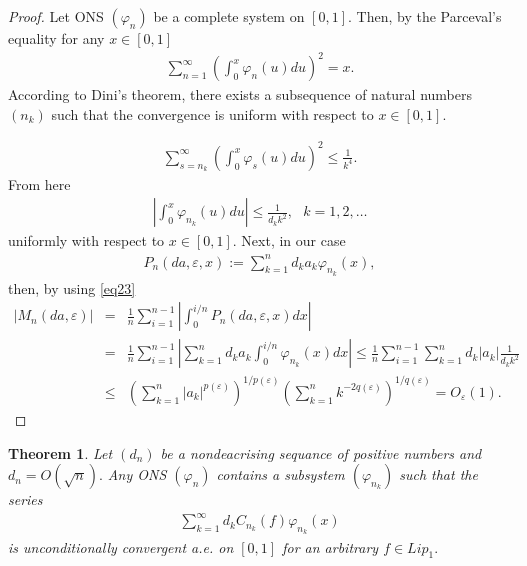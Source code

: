 \documentclass{publmathdeb}
\newtheorem{theorem}{Theorem}[section]
\begin{document}
	\begin{proof}
		Let ONS $(\varphi_{n})$ be a complete system on $[0,1].$ Then, by the Parceval's equality for any $x \in [0,1]$
		\begin{eqnarray*}
			\sum_{n=1}^{\infty} \left(\int_{0}^{x} \varphi_{n} (u) du \right)^2 = x.
		\end{eqnarray*}
		According to Dini's theorem, there exists a subsequence of natural numbers \((n_k)\) such that the convergence is uniform with respect to \(x \in [0,1]\).
		
		\begin{eqnarray*}
			\sum_{s=n_k}^{\infty} \left(\int_{0}^{x} \varphi_{s} (u) du \right)^2 \leq \frac{1}{k^4}.
		\end{eqnarray*}
		From here 
		\begin{eqnarray} \label{eq23}
			\left|\int_{0}^{x} \varphi_{n_k} (u) du \right| \leq \frac{1}{d_k k^2}, \ \ \ k=1, 2, \dots
		\end{eqnarray}
		uniformly with respect to $x\in [0,1].$ Next, in our case 
		\begin{eqnarray*}
			P_n(da, \varepsilon, x) := \sum_{k=1}^{n} d_k a_k \varphi_{n_k} (x),
		\end{eqnarray*}
		then, by using \eqref{eq23}
		\begin{eqnarray*}
			\left|M_n(d a,\varepsilon)\right|&=& \frac{1}{n} \sum_{i=1}^{n-1} \left| \int_{0}^{i/n} P_n(da, \varepsilon, x) dx \right| \\
			&=& \frac{1}{n} \sum_{i=1}^{n-1} \left| \sum_{k=1}^{n} d_k a_k \int_{0}^{i/n}\varphi_{n_k} (x) dx  \right| \leq \frac{1}{n} \sum_{i=1}^{n-1}  \sum_{k=1}^{n} d_k \left|a_k\right|  \frac{1}{d_k k^2}  \\
			&\leq& \left(\sum_{k=1}^{n} \left|a_k\right| ^{p(\varepsilon)}\right)^{1/{p(\varepsilon)}} \left(\sum_{k=1}^{n} k^{-2q(\varepsilon)}\right)^{1/q(\varepsilon)} =O_{\varepsilon}(1).
		\end{eqnarray*}
		
	\end{proof}
	
	
	
	\begin{theorem}
		\label{theorem5} Let $(d_n)$ be a nondeacrising sequance of positive numbers and $d_n=O(\sqrt{n}).$ Any ONS $(\varphi_n)$ contains a subsystem $(\varphi_{n_k})$ such that the series 
		\begin{eqnarray*}
			\sum_{k=1}^{\infty}d_k C_{n_k} (f) \varphi_{n_{k}} (x)
		\end{eqnarray*}
		is unconditionally convergent a.e. on $[0,1]$ for an arbitrary $f\in Lip_1.$
	\end{theorem}
	
\end{document}
